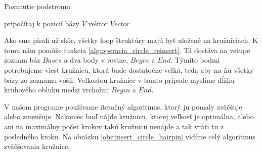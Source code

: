 \begin{algorithm}
  \caption{Posunutie podstromu}
  \label{alg:operacia_tree_shift}
  \begin{algorithmic}[1]
          \State pripočítaj k pozicií bázy $V$ vektor $Vector$
        \EndIf
      \EndFor
    \EndProcedure
  \end{algorithmic}
\end{algorithm}

Ako sme písali už skôr, všetky loop štruktúry majú byť uložené na kružniciach. K tomu nám pomôže funkcia
\ref{alg:operacia_circle_reinsert}. Tá dostáva na vstupe zoznam báz $Bases$ a dva body v rovine, $Begin$ a $End$.
Týmito bodmi potrebujeme viesť kružnicu, ktorá bude dostatočne veľká, teda aby na ňu všetky bázy zo zoznamu vošli.
Veľkosťou kružnice v tomto prípade myslíme dĺžku kruhového obluku medzi vrcholmi $Begin$ a $End$.

V našom programe používame iteračný algoritmus, ktorý ju pomaly zväčšuje alebo zmenšuje.
Nakoniec buď nájde kružnicu, ktorej veľkosť je optimálna, alebo ani na maximálny počet krokov takú kružnicu nenájde
a tak vráti tu z posledného kroku. Na obrázku \ref{obr:insert_circle_hairpin} vidíme celý algoritmus zväčšovania kružnice.

